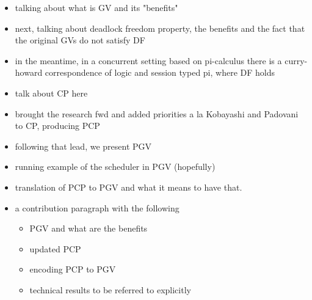 \documentclass[main.tex]{subfiles}
\begin{document}
\begin{itemize}
\item talking about what is GV and its "benefits"
\item next, talking about deadlock freedom property, the benefits and the fact that the original GVs do not satisfy DF
\item in the meantime, in a concurrent setting based on pi-calculus there is a curry-howard correspondence of logic and session typed pi, where DF holds
\item talk about CP here
\item \cite{dardha2018} brought the research fwd and added priorities a la Kobayashi and Padovani to CP, producing PCP
\item following that lead, we present PGV
\item running example of the scheduler in PGV (hopefully)
\item translation of PCP to PGV and what it means to have that.
\item a contribution paragraph with the following
  \begin{itemize}
  \item PGV and what are the benefits
  \item updated PCP
  \item encoding PCP to PGV
  \item technical results to be referred to explicitly
  \end{itemize}
\end{itemize}
\end{document}
